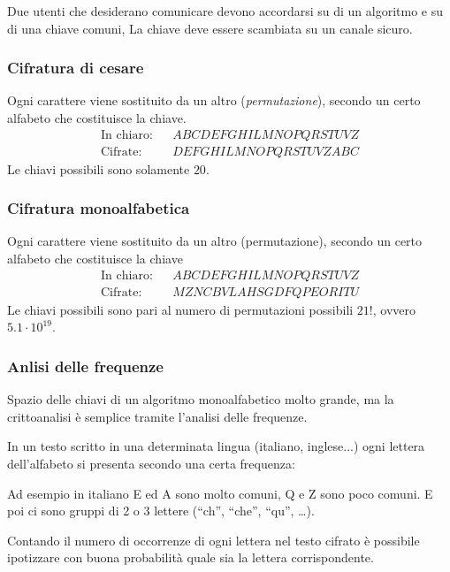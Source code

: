 \documentclass[oneside,a4paper,11pt]{book}
\theoremstyle{italicstyle}
\theoremstyle{normStyle}
\begin{document}
Due utenti che desiderano comunicare devono accordarsi su di un algoritmo e su di una chiave comuni,
La chiave deve essere scambiata su un canale sicuro.
\subsubsection{Cifratura di cesare}
Ogni carattere viene sostituito da un altro (\textit{permutazione}), secondo un certo alfabeto
che costituisce la chiave.
\[
\begin{matrix}
  \text{In chiaro}: && A B C D E F G H I L M N O P Q R S T U V Z \\
  \text{Cifrate}: &&  D E F G H I L M N O P Q R S T U V Z A B C  
\end{matrix}
\]
Le chiavi possibili sono solamente $20$.
\subsubsection{Cifratura monoalfabetica}
Ogni carattere viene sostituito da un altro (permutazione), secondo un certo alfabeto che costituisce la chiave 
\[
\begin{matrix}
  \text{In chiaro}: && A B C D E F G H I L M N O P Q R S T U V Z \\
  \text{Cifrate}: &&  M Z N C B V L A H S G D F Q P E O R I T U
\end{matrix}
\]
Le chiavi possibili sono pari al numero di permutazioni possibili $21!$,
ovvero $5.1 \cdot 10^{19}$.

\subsubsection{Anlisi delle frequenze}
Spazio delle chiavi di un algoritmo monoalfabetico molto grande, ma 
la crittoanalisi è semplice tramite l'analisi delle frequenze.

In un testo scritto in una determinata lingua (italiano, inglese...)
ogni lettera dell’alfabeto si presenta secondo una certa frequenza:

Ad esempio in italiano E ed A sono molto comuni, Q e Z sono poco comuni.
E poi ci sono gruppi di 2 o 3 lettere (“ch”, “che”, “qu”, \dots).

Contando il numero di occorrenze di ogni lettera nel testo cifrato è possibile ipotizzare
con buona probabilità quale sia la lettera corrispondente.
\end{document}
